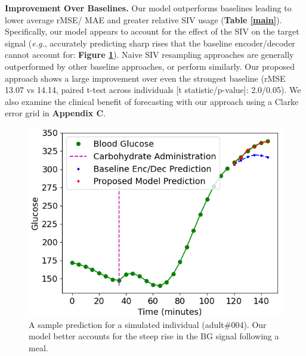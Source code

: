 \documentclass[letterpaper]{article}
\begin{document}
\textbf{Improvement Over Baselines.} Our model outperforms baselines leading to lower average rMSE/ MAE and greater relative SIV usage (\textbf{Table \ref{main}}). Specifically, our model appears to account for the effect of the SIV on the target signal (\textit{e.g.}, accurately predicting sharp rises that the baseline encoder/decoder cannot account for: \textbf{Figure \ref{fig:sampplot}}). Naive SIV resampling approaches are generally outperformed by other baseline approaches, or perform similarly. Our proposed approach shows a large improvement over even the strongest baseline (rMSE 13.07 vs 14.14, paired t-test across individuals [t statistic/p-value]: 2.0/0.05).  We also examine the clinical benefit of forecasting with our approach using a Clarke error grid in \textbf{Appendix C}.

\begin{figure}[t]
\centering
\hspace*{-.3cm}  \includegraphics[height=1.7 in]{91.png}
\caption{A sample prediction for a simulated individual (adult\#004). Our model better accounts for the steep rise in the BG signal following a meal.}\label{fig:sampplot}
\end{figure}
\end{document}
